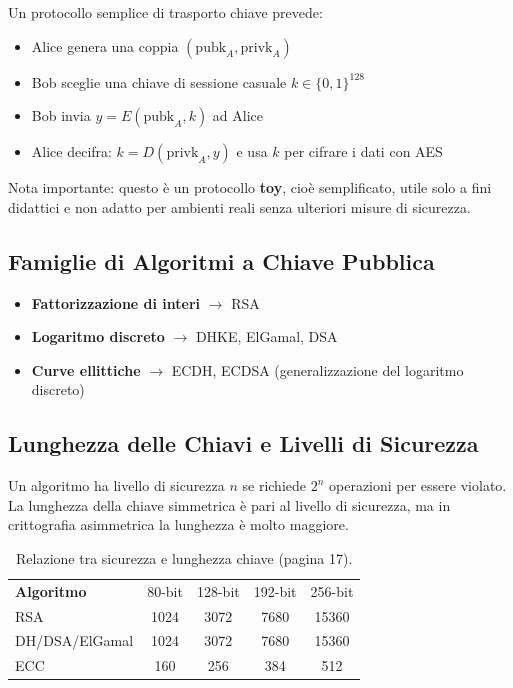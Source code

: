 \documentclass{report}
\begin{document}
Un protocollo semplice di trasporto chiave prevede:
\begin{itemize}
  \item Alice genera una coppia $(\text{pubk}_A, \text{privk}_A)$
  \item Bob sceglie una chiave di sessione casuale $k \in \{0,1\}^{128}$
  \item Bob invia $y = E(\text{pubk}_A, k)$ ad Alice
  \item Alice decifra: $k = D(\text{privk}_A, y)$ e usa $k$ per cifrare i dati con AES
\end{itemize}

Nota importante: questo \`e un protocollo \textbf{toy}, cio\`e semplificato, utile solo a fini didattici e non adatto per ambienti reali senza ulteriori misure di sicurezza.

\subsection{Famiglie di Algoritmi a Chiave Pubblica}

\begin{itemize}
  \item \textbf{Fattorizzazione di interi} $\rightarrow$ RSA
  \item \textbf{Logaritmo discreto} $\rightarrow$ DHKE, ElGamal, DSA
  \item \textbf{Curve ellittiche} $\rightarrow$ ECDH, ECDSA (generalizzazione del logaritmo discreto)
\end{itemize}

\subsection{Lunghezza delle Chiavi e Livelli di Sicurezza}

Un algoritmo ha livello di sicurezza $n$ se richiede $2^n$ operazioni per essere violato. La lunghezza della chiave simmetrica \`e pari al livello di sicurezza, ma in crittografia asimmetrica la lunghezza \`e molto maggiore.

\begin{table}[h]
    \centering
    \begin{tabular}{lcccc}
        \textbf{Algoritmo} & 80-bit & 128-bit & 192-bit & 256-bit \\
        RSA & 1024 & 3072 & 7680 & 15360 \\
        DH/DSA/ElGamal & 1024 & 3072 & 7680 & 15360 \\
        ECC & 160 & 256 & 384 & 512 \\
    \end{tabular}
    \caption{Relazione tra sicurezza e lunghezza chiave (pagina 17).}
    \label{tab:key_lengths}
\end{table}
\end{document}
